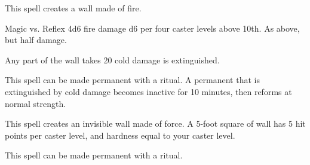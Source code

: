 \begin{spellheader}
\end{spellheader}
\begin{spellcontent}
    \begin{spelltargetinginfo}
    \end{spelltargetinginfo}
    \begin{spelleffects}
        \spelleffect This spell creates a wall made of fire.
        \spelldur{\durshort}
    \end{spelleffects}
\end{spellcontent}
\begin{spellsubcontent}
    \begin{spelltargetinginfo}
    \end{spelltargetinginfo}
    \begin{spelleffects}
        \begin{spellattack}{Magic vs. Reflex}
            \spellsuccess 4d6 fire damage \add d6 per four caster levels above 10th.
            \spellfailure As above, but half damage.
        \end{spellattack}
    \end{spelleffects}
\end{spellsubcontent}
\begin{spellfooter}
    \spellnotes Any part of the wall takes 20 cold damage is extinguished.

    This spell can be made permanent with a  ritual. A permanent  that is extinguished by cold damage becomes inactive for 10 minutes, then reforms at normal strength.
\end{spellfooter}

\begin{spellheader}
    \begin{spelltargetinginfo}
    \end{spelltargetinginfo}
    \begin{spelleffects}
    \end{spelleffects}
\end{spellheader}
\begin{spellcontent}
    \spelleffect This spell creates an invisible wall made of force. A 5-foot square of wall has 5 hit points per caster level, and hardness equal to your caster level.
    \spelldur{\durshort \dismissable}
\end{spellcontent}
\begin{spellfooter}
    \spellnotes \forcespellnotes

    This spell can be made permanent with a  ritual.
\end{spellfooter}

